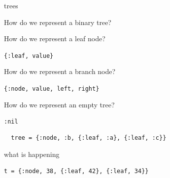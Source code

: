 \begin{frame}[fragile]{trees}

\pause How do we represent a binary tree?

\vspace{10pt}
\pause How do we represent a leaf node?

\vspace{10pt}
{\tt \{:leaf, value\}}

\vspace{20pt}
\pause How do we represent a branch node?

\vspace{10pt}
{\tt \{:node, value, left, right\}}

\vspace{10pt}
\pause How do we represent an empty tree?

\vspace{10pt}
{\tt :nil}

\vspace{10pt}

\begin{verbatim}
  tree = {:node, :b, {:leaf, :a}, {:leaf, :c}}
\end{verbatim}

\end{frame}


\begin{frame}{what is happening}

{\tt t = \{:node, 38, \{:leaf, 42\}, \{:leaf, 34\}\}}

\pause \vspace{20pt}


\end{frame}

